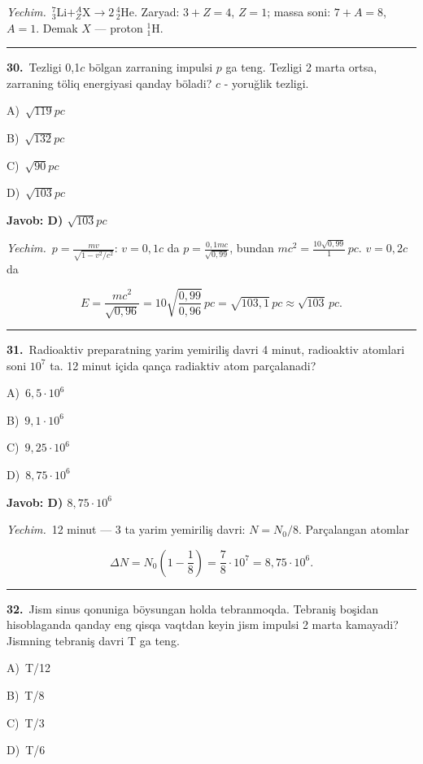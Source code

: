 \documentclass[11pt,a4paper]{article}
\newcommand{\opt}[2]{\hspace*{4mm}#1)\ #2\par}
\begin{document}
\noindent\textit{Yechim.}\ $^7_3\mathrm{Li}+^A_Z\mathrm X\to2\,^4_2\mathrm{He}$. Zaryad: $3+Z=4$, $Z=1$; massa soni: $7+A=8$, $A=1$. Demak $X$ — proton $^1_1\mathrm H$.\par\par\medskip\hrule\medskip
{}\noindent\begin{minipage}{\linewidth}
\textbf{30.}\ Tezligi 0,1$c$ bölgan zarraning impulsi $p$ ga teng. Tezligi 2 marta ortsa, zarraning töliq energiyasi qanday böladi? $c$ - yoruğlik tezligi.\par\smallskip
\opt{A}{$\sqrt{119}pc$}
\opt{B}{$\sqrt{132}pc$}
\opt{C}{$\sqrt{90}pc$}
\opt{D}{$\sqrt{103}pc$}
\end{minipage}\vspace{2pt}\par
\noindent\colorbox{gray!12}{\parbox{\dimexpr\linewidth-2\fboxsep}{\textbf{Javob: D) $\sqrt{103}pc$}}}\par\smallskip
\noindent\textit{Yechim.}\ $p=\frac{mv}{\sqrt{1-v^2/c^2}}$: $v=0{,}1c$ da $p=\frac{0{,}1mc}{\sqrt{0{,}99}}$, bundan $mc^2=\frac{10\sqrt{0{,}99}}{1}\,pc$. $v=0{,}2c$ da\par
\[E=\frac{mc^2}{\sqrt{0{,}96}}=10\sqrt{\frac{0{,}99}{0{,}96}}\,pc=\sqrt{103{,}1}\,pc\approx\sqrt{103}\,pc.\]\par\medskip\hrule\medskip
{}\noindent\begin{minipage}{\linewidth}
\textbf{31.}\ Radioaktiv preparatning yarim yemiriliş davri 4 minut, radioaktiv atomlari soni $10^7$ ta. 12 minut içida qança radiaktiv atom parçalanadi?\par\smallskip
\opt{A}{$6{,}5\cdot10^6$}
\opt{B}{$9{,}1\cdot10^6$}
\opt{C}{$9{,}25\cdot10^6$}
\opt{D}{$8{,}75\cdot10^6$}
\end{minipage}\vspace{2pt}\par
\noindent\colorbox{gray!12}{\parbox{\dimexpr\linewidth-2\fboxsep}{\textbf{Javob: D) $8{,}75\cdot10^6$}}}\par\smallskip
\noindent\textit{Yechim.}\ 12 minut — 3 ta yarim yemiriliş davri: $N=N_0/8$. Parçalangan atomlar\par
\[\Delta N=N_0\left(1-\frac18\right)=\frac78\cdot10^7=8{,}75\cdot10^6.\]\par\medskip\hrule\medskip
{}\noindent\begin{minipage}{\linewidth}
\textbf{32.}\ Jism sinus qonuniga böysungan holda tebranmoqda. Tebraniş boşidan hisoblaganda qanday eng qisqa vaqtdan keyin jism impulsi 2 marta kamayadi? Jismning tebraniş davri T ga teng.\par\smallskip
\opt{A}{T/12}
\opt{B}{T/8}
\opt{C}{T/3}
\opt{D}{T/6}
\end{minipage}\vspace{2pt}\par
\end{document}
